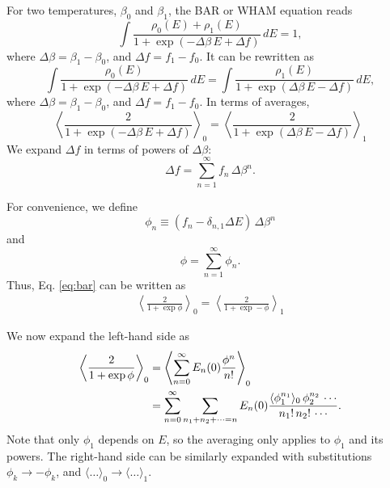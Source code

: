\documentclass[aip,jcp,preprint,notitlepage, superscriptaddress]{revtex4-1}
\begin{document}
For two temperatures, $\beta_0$ and $\beta_1$,
the BAR or WHAM equation reads
%
\begin{equation*}
\int
  \frac{ \rho_0(E) + \rho_1(E) }
  { 1 + \exp( -\Delta \beta \, E + \Delta f ) }
  \, d E
= 1,
\end{equation*}
%
where $\Delta \beta = \beta_1 - \beta_0$,
and
$\Delta f = f_1 - f_0$.
%
It can be rewritten as
%
\begin{equation*}
\int
  \frac{ \rho_0(E) }
  { 1 + \exp( -\Delta \beta \, E + \Delta f ) }
  \, d E
=
\int
  \frac{ \rho_1(E) }
  { 1 + \exp( \Delta \beta \, E - \Delta f ) }
  \, d E,
\end{equation*}
%
where
$\Delta \beta = \beta_1 - \beta_0$,
and
$\Delta f = f_1 - f_0$.
%
In terms of averages,
\begin{equation}
\left\langle
  \frac{ 2 }
  { 1 + \exp( -\Delta \beta \, E + \Delta f ) }
\right\rangle_0
=
\left\langle
  \frac{ 2 }
  { 1 + \exp( \Delta \beta \, E - \Delta f ) }
\right\rangle_1
\label{eq:bar}
\end{equation}
%
We expand $\Delta f$ in terms of powers of $\Delta \beta$:
\[
\Delta f
=
\sum_{n = 1}^\infty f_n \, \Delta \beta^n.
\]



For convenience,
we define
\[
\phi_n \equiv (f_n - \delta_{n,1} \Delta E) \, \Delta \beta^n
\]
and
\[
\phi = \sum_{n = 1}^\infty \phi_n.
\]
Thus, Eq. \eqref{eq:bar} can be written as
\begin{align*}
\left\langle
  \frac{ 2 }
  { 1 + \exp \phi  }
\right\rangle_0
=
\left\langle
  \frac{ 2 }
  { 1 + \exp -\phi }
\right\rangle_1
\label{eq:bar1}
\end{align*}


We now expand the left-hand side as
%
\begin{align*}
\left\langle
  \frac{ 2 }
  { 1 + \exp \phi  }
\right\rangle_0
&=
\left\langle
\sum_{n = 0}^\infty
E_n(0) \frac{ \phi^n } { n! }
\right\rangle_0
\notag \\
&=
\sum_{n = 0}^\infty
\sum_{n_1 + n_2 + \dots = n}
E_n(0)
\frac{ \langle \phi_1^{n_1} \rangle_0 \,
      \phi_2^{n_2} \, \cdots } { n_1! \, n_2! \, \cdots }.
\end{align*}
%
Note that only $\phi_1$ depends on $E$,
so the averaging only applies to $\phi_1$ and its powers.
%
The right-hand side
can be similarly expanded
with substitutions
$\phi_k \rightarrow -\phi_k$,
and
$\langle \dots \rangle_0 \rightarrow \langle \dots \rangle_1$.
\end{document}
